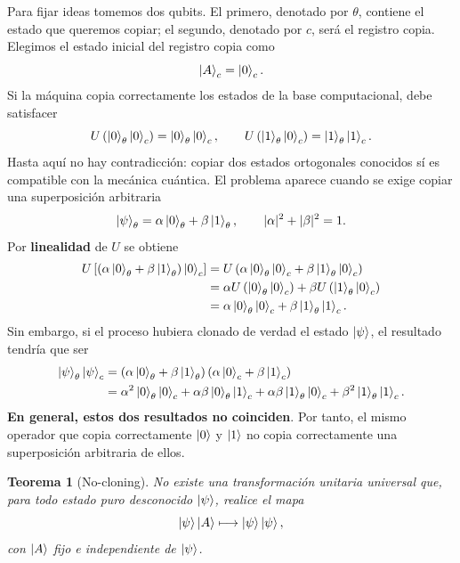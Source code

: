 \documentclass[12pt,a4paper]{article}
\theoremstyle{definition}
\theoremstyle{plain}
\newtheorem{teorema}[definicion]{Teorema}
\theoremstyle{remark}
\begin{document}
Para fijar ideas tomemos dos qubits. El primero, denotado por $\theta$, contiene el estado que queremos copiar; el segundo, denotado por $c$, será el registro copia. Elegimos el estado inicial del registro copia como
\begin{equation*}
    \ket{A}_c=\ket{0}_c.
\end{equation*}
Si la máquina copia correctamente los estados de la base computacional, debe satisfacer
\begin{equation*}
    U\left(\ket{0}_\theta\ket{0}_c\right)
    =
    \ket{0}_\theta\ket{0}_c,
    \qquad
    U\left(\ket{1}_\theta\ket{0}_c\right)
    =
    \ket{1}_\theta\ket{1}_c.
\end{equation*}
Hasta aquí no hay contradicción: copiar dos estados ortogonales conocidos sí es compatible con la mecánica cuántica. El problema aparece cuando se exige copiar una superposición arbitraria
\begin{equation*}
    \ket{\psi}_\theta=\alpha\ket{0}_\theta+\beta\ket{1}_\theta,
    \qquad
    |\alpha|^2+|\beta|^2=1.
\end{equation*}
Por \textbf{linealidad} de $U$ se obtiene
\begin{align*}
    U\left[\left(\alpha\ket{0}_\theta+\beta\ket{1}_\theta\right)\ket{0}_c\right]
    &=U\left(\alpha\ket{0}_\theta\ket{0}_c+
    \beta\ket{1}_\theta\ket{0}_c\right)\\
    &=\alpha U\left(\ket{0}_\theta\ket{0}_c\right)
    +\beta U\left(\ket{1}_\theta\ket{0}_c\right)\\
    &=\alpha\ket{0}_\theta\ket{0}_c+
    \beta\ket{1}_\theta\ket{1}_c.
\end{align*}
Sin embargo, si el proceso hubiera clonado de verdad el estado $\ket{\psi}$, el resultado tendría que ser
\begin{align*}
    \ket{\psi}_\theta\ket{\psi}_c
    &=
    \left(\alpha\ket{0}_\theta+\beta\ket{1}_\theta\right)
    \left(\alpha\ket{0}_c+\beta\ket{1}_c\right)\\
    &=
    \alpha^2\ket{0}_\theta\ket{0}_c
    +\alpha\beta\ket{0}_\theta\ket{1}_c
    +\alpha\beta\ket{1}_\theta\ket{0}_c
    +\beta^2\ket{1}_\theta\ket{1}_c.
\end{align*}
\textbf{En general, estos dos resultados no coinciden}. Por tanto, el mismo operador que copia correctamente $\ket{0}$ y $\ket{1}$ no copia correctamente una superposición arbitraria de ellos.

\begin{teorema}[No-cloning]
No existe una transformación unitaria universal que, para todo estado puro desconocido $\ket{\psi}$, realice el mapa
\begin{equation*}
    \ket{\psi}\ket{A}\longmapsto \ket{\psi}\ket{\psi},
\end{equation*}
con $\ket{A}$ fijo e independiente de $\ket{\psi}$.
\end{teorema}
\end{document}
